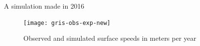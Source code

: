 \documentclass[hide notes,intlimits]{beamer}
\begin{document}
\begin{frame}{A simulation made in 2016}
  \begin{figure}
    \texttt{[image: gris-obs-exp-new]}
    \caption{Observed and simulated surface speeds in meters per year}
  \end{figure}
\end{frame}





\end{document}
